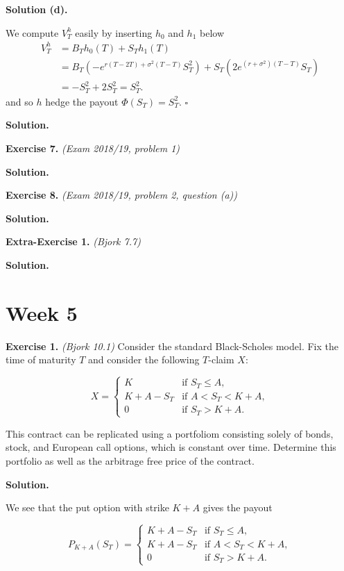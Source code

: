 \documentclass[a4paper,12pt,openany]{book}
\begin{document}
\textbf{Solution (d).}

We compute \(V_T^h\) easily by inserting \(h_0\) and \(h_1\) below
\begin{align*}
V_T^h&=B_Th_0(T)+S_Th_1(T)\\
&=B_T\left(-e^{r(T-2T)+\sigma^2(T-T)}S_T^2\right)+S_T\left(2e^{(r+\sigma^2)(T-T)}S_T\right)\\
&=-S_T^2+2S_T^2=S_T^2.
\end{align*}
and so \(h\) hedge the payout \(\Phi(S_T)=S_T^2\). \(\square\)

\textbf{Solution.}

\textbf{Exercise 7.} \emph{(Exam 2018/19, problem 1)}

\textbf{Solution.}

\textbf{Exercise 8.} \emph{(Exam 2018/19, problem 2, question (a))}

\textbf{Solution.}

\textbf{Extra-Exercise 1.} \emph{(Bjork 7.7)}

\textbf{Solution.}

\hypertarget{week-5}{%
\section{Week 5}\label{week-5}}

\textbf{Exercise 1.} \emph{(Bjork 10.1)} Consider the standard Black-Scholes model. Fix the time of maturity \(T\) and consider the following \(T\)-claim \(X\):

\[
X=
\begin{cases}
  K & \text{if }S_T\le A,\\
  K+A-S_T & \text{if }A<S_T<K+ A,\\
  0 & \text{if }S_T > K+ A.
\end{cases}  
\]

This contract can be replicated using a portfoliom consisting solely of bonds, stock, and European call options, which is constant over time. Determine this portfolio as well as the arbitrage free price of the contract.

\textbf{Solution.}

We see that the put option with strike \(K+A\) gives the payout

\[
P_{K+A}(S_T)=
\begin{cases}
  K+A-S_T & \text{if }S_T\le A,\\
  K+A-S_T & \text{if }A<S_T<K+ A,\\
  0 & \text{if }S_T > K+ A.
\end{cases}
\]
\end{document}
